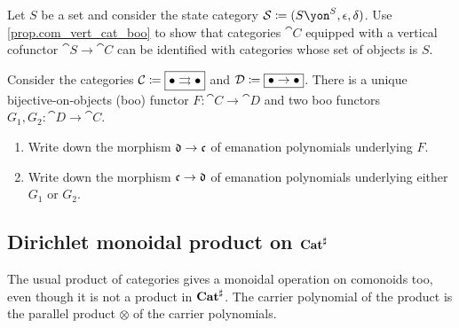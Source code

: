 \documentclass[Book-Poly]{subfiles}
\begin{document}
\begin{exercise}
Let $S$ be a set and consider the state category $\cat{S}\coloneqq(S\yon^S,\epsilon,\delta)$. Use \cref{prop.com_vert_cat_boo} to show that categories $\cat{C}$ equipped with a vertical cofunctor $\cat{S}\to\cat{C}$ can be identified with categories whose set of objects is $S$.
\end{exercise}

\begin{exercise}
Consider the categories $\mathcal{C}\coloneqq\fbox{$\bullet\rightrightarrows\bullet$}$ and $\mathcal{D}\coloneqq\fbox{$\bullet\to\bullet$}$. There is a unique bijective-on-objects (boo) functor $F\colon\cat{C}\to\cat{D}$ and two boo functors $G_1,G_2\colon\cat{D}\to\cat{C}$.
\begin{enumerate}
	\item Write down the morphism $\mathfrak{d}\to\mathfrak{c}$ of emanation polynomials underlying $F$.
	\item Write down the morphism $\mathfrak{c}\to\mathfrak{d}$ of emanation polynomials underlying either $G_1$ or $G_2$.
\qedhere
\end{enumerate}
\end{exercise}

\subsection{Dirichlet monoidal product on $\mathbf{Cat}^\sharp$}

The usual product of categories gives a monoidal operation on comonoids too, even though it is not a product in $\mathbf{Cat}^\sharp$. The carrier polynomial of the product is the parallel product $\otimes$ of the carrier polynomials.
\end{document}
